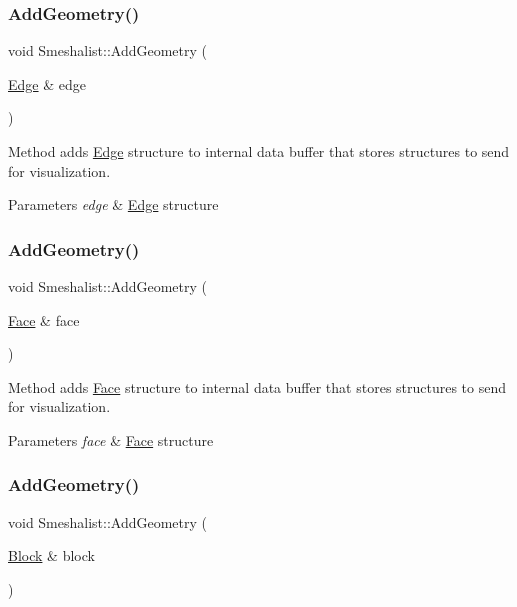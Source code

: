 \subsubsection{\texorpdfstring{Add\+Geometry()}{AddGeometry()}\hspace{0.1cm}{\footnotesize\ttfamily [3/5]}}
{\footnotesize\ttfamily void Smeshalist\+::\+Add\+Geometry (\begin{DoxyParamCaption}\item[{\hyperlink{class_edge}{Edge} \&}]{edge }\end{DoxyParamCaption})}

Method adds \hyperlink{class_edge}{Edge} structure to internal data buffer that stores structures to send for visualization. 
\begin{DoxyParams}{Parameters}
{\em edge} & \hyperlink{class_edge}{Edge} structure \\
\hline
\end{DoxyParams}
\hypertarget{class_smeshalist_a3b562ba90203c809e48c42f635b50e70}{}\label{class_smeshalist_a3b562ba90203c809e48c42f635b50e70} 
\subsubsection{\texorpdfstring{Add\+Geometry()}{AddGeometry()}\hspace{0.1cm}{\footnotesize\ttfamily [4/5]}}
{\footnotesize\ttfamily void Smeshalist\+::\+Add\+Geometry (\begin{DoxyParamCaption}\item[{\hyperlink{class_face}{Face} \&}]{face }\end{DoxyParamCaption})}

Method adds \hyperlink{class_face}{Face} structure to internal data buffer that stores structures to send for visualization. 
\begin{DoxyParams}{Parameters}
{\em face} & \hyperlink{class_face}{Face} structure \\
\hline
\end{DoxyParams}
\hypertarget{class_smeshalist_a4307536971e1f8bfcd921b4f12198579}{}\label{class_smeshalist_a4307536971e1f8bfcd921b4f12198579} 
\subsubsection{\texorpdfstring{Add\+Geometry()}{AddGeometry()}\hspace{0.1cm}{\footnotesize\ttfamily [5/5]}}
{\footnotesize\ttfamily void Smeshalist\+::\+Add\+Geometry (\begin{DoxyParamCaption}\item[{\hyperlink{class_block}{Block} \&}]{block }\end{DoxyParamCaption})}

